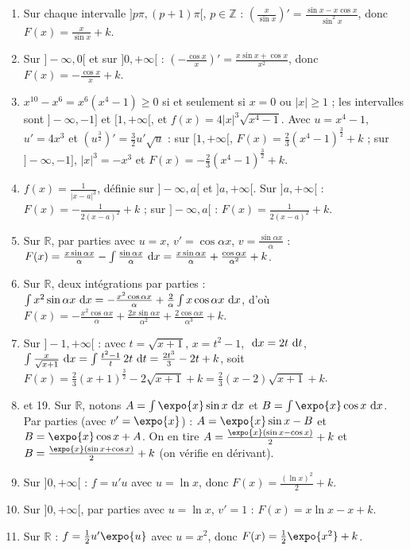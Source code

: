 \begin{corrige}
\begin{enumerate}
      o\`u $f(x) = \frac{1}{x^2}$ : $F(x) = -\frac{1}{x} + k$.
\item Sur chaque intervalle $]p\pi,(p+1)\pi[$, $p\in\mathbb{Z}$ :
      $\left(\frac{x}{\sin x}\right)' = \frac{\sin x - x\cos x}{\sin^2 x}$, donc $F(x) = \frac{x}{\sin x} + k$.
\item Sur $]-\infty,0[$ et sur $]0,+\infty[$ :
      $\left(-\frac{\cos x}{x}\right)' = \frac{x\sin x + \cos x}{x^2}$, donc $F(x) = -\frac{\cos x}{x} + k$.
\item $x^{10} - x^6 = x^6(x^4-1) \geq 0$ si et seulement si $x = 0$ ou $|x| \geq 1$ ;
      les intervalles sont $]-\infty,-1]$ et $[1,+\infty[$, et $f(x) = 4|x|^3\sqrt{x^4-1}$.
      Avec $u = x^4 - 1$, $u' = 4x^3$ et $\left(u^{\frac{3}{2}}\right)' = \frac{3}{2}u'\sqrt{u}$ :
      sur $[1,+\infty[$, $F(x) = \frac{2}{3}\left(x^4-1\right)^{\frac{3}{2}} + k$ ;
      sur $]-\infty,-1]$, $|x|^3 = -x^3$ et $F(x) = -\frac{2}{3}\left(x^4-1\right)^{\frac{3}{2}} + k$.
\item $f(x) = \frac{1}{|x-a|^3}$, d\'efinie sur $]-\infty,a[$ et $]a,+\infty[$.
      Sur $]a,+\infty[$ : $F(x) = -\frac{1}{2(x-a)^2} + k$ ; sur $]-\infty,a[$ : $F(x) = \frac{1}{2(x-a)^2} + k$.
\item Sur $\mathbb{R}$, par parties avec $u = x$, $v' = \cos\alpha x$, $v = \frac{\sin \alpha x}{\alpha}$ :
      $F(x) = \frac{x \sin \alpha x}{\alpha} - \int \frac{\sin\alpha x}{\alpha}~\mathrm{d}x
      = \frac{x\sin\alpha x}{\alpha} + \frac{\cos\alpha x}{\alpha^2} + k$.
\item Sur $\mathbb{R}$, deux int\'egrations par parties :
      $\int x^2\sin\alpha x ~\mathrm{d}x = -\frac{x^2\cos\alpha x}{\alpha} + \frac{2}{\alpha}\int x\cos\alpha x~\mathrm{d}x$, d'o\`u
      $F(x) = -\frac{x^2\cos\alpha x}{\alpha} + \frac{2x\sin\alpha x}{\alpha^2} + \frac{2\cos\alpha x}{\alpha^3} + k$.
\item Sur $]-1,+\infty[$ : avec $t = \sqrt{x+1}$, $x = t^2-1$, $~\mathrm{d}x = 2t~\mathrm{d}t$,
      $\int \frac{x}{\sqrt{x+1}}~\mathrm{d}x = \int \frac{t^2-1}{t}\,2t~\mathrm{d}t = \frac{2t^3}{3} - 2t + k$, soit
      $F(x) = \frac{2}{3}(x+1)^{\frac{3}{2}} - 2\sqrt{x+1} + k = \frac{2}{3}(x-2)\sqrt{x+1} + k$.
\item et 19. Sur $\mathbb{R}$, notons $A = \int \expo{x}\sin x\dx$ et $B = \int\expo{x}\cos x\dx$.
      Par parties (avec $v' = \expo{x}$) : $A = \expo{x}\sin x - B$ et $B = \expo{x}\cos x + A$.
      On en tire $A = \frac{\expo{x}(\sin x - \cos x)}{2} + k$ et $B = \frac{\expo{x}(\sin x + \cos x)}{2} + k$
      (on v\'erifie en d\'erivant).
\setcounter{enumi}{19}
\item Sur $]0,+\infty[$ : $f = u'u$ avec $u = \ln x$, donc $F(x) = \frac{(\ln x)^2}{2} + k$.
\item Sur $]0,+\infty[$, par parties avec $u = \ln x$, $v' = 1$ : $F(x) = x\ln x - x + k$.
\item Sur $\mathbb{R}$ : $f = \frac{1}{2}u'\expo{u}$ avec $u = x^2$, donc $F(x) = \frac{1}{2}\expo{x^2} + k$.
\end{enumerate}


\end{corrige}

